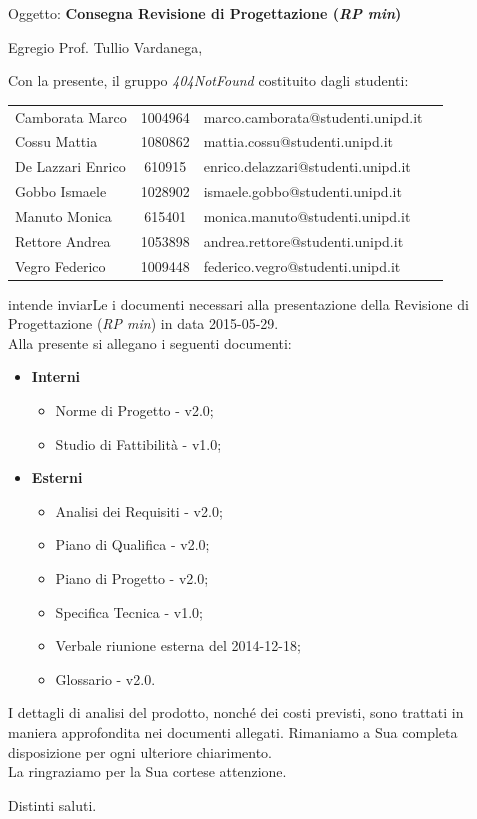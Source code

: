 \documentclass[a4paper,10pt]{letter}
\newcommand{\gruppo}{404NotFound}
\newcommand{\Vardanega}{Prof. Tullio Vardanega}
\newcommand{\VeFe}{Vegro Federico}
\newcommand{\CaMa}{Camborata Marco}
\newcommand{\GoIs}{Gobbo Ismaele}
\newcommand{\DeEn}{De Lazzari Enrico}
\newcommand{\CoMa}{Cossu Mattia}
\newcommand{\ReAn}{Rettore Andrea}
\newcommand{\MaMo}{Manuto Monica}
\begin{document}
	
	\begin{letter}{Oggetto: \textbf{Consegna Revisione di Progettazione (\textit{RP min})}}
	\opening {Egregio \Vardanega ,}
	Con la presente, il gruppo \textit{\gruppo} costituito dagli studenti: 
		\begin{center}
		\begin{tabular}{l c l c}					
		\CaMa & 1004964 & marco.camborata@studenti.unipd.it \\
		\CoMa & 1080862 & mattia.cossu@studenti.unipd.it\\
		\DeEn & 610915  & enrico.delazzari@studenti.unipd.it\\ 
		\GoIs & 1028902 & ismaele.gobbo@studenti.unipd.it\\
		\MaMo & 615401  & monica.manuto@studenti.unipd.it\\
		\ReAn & 1053898 & andrea.rettore@studenti.unipd.it\\
		\VeFe & 1009448 & federico.vegro@studenti.unipd.it\\
		\end{tabular}
		\end{center}
	intende inviarLe i documenti necessari alla presentazione della Revisione di Progettazione (\textit{RP min}) in data 2015-05-29.\\
    Alla presente si allegano i seguenti documenti:
			\begin{itemize}
				\item \textbf{Interni}
					\begin{itemize}
						\item Norme di Progetto - v2.0;
						\item Studio di Fattibilità - v1.0;
					\end{itemize}
				\item \textbf{Esterni}
					\begin{itemize}
						\item Analisi dei Requisiti - v2.0;
						\item Piano di Qualifica - v2.0;
						\item Piano di Progetto - v2.0;
						\item Specifica Tecnica - v1.0;					
						\item Verbale riunione esterna del 2014-12-18;						
						\item Glossario - v2.0.
					\end{itemize}
			\end{itemize} 
		I dettagli di analisi del prodotto, nonché dei costi previsti, sono trattati in maniera approfondita nei documenti allegati. Rimaniamo a Sua completa disposizione per ogni ulteriore chiarimento.\\ 
		La ringraziamo per la Sua cortese attenzione.
\thispagestyle{fancy}
\closing{Distinti saluti.}
   \end{letter}
\end{document}

